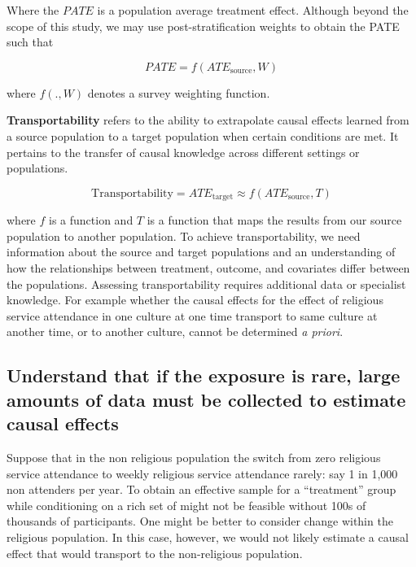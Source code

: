 \documentclass[
  singlecolumn]{report}
\begin{document}
Where the \(PATE\) is a population average treatment effect. Although
beyond the scope of this study, we may use post-stratification weights
to obtain the PATE such that

\[PATE =  f(ATE_{\text{source}}, W)\]

where \(f(.,W)\) denotes a survey weighting function.

\textbf{Transportability} refers to the ability to extrapolate causal
effects learned from a source population to a target population when
certain conditions are met. It pertains to the transfer of causal
knowledge across different settings or populations.

\[\text{Transportability} = ATE_{\text{target}} \approx f(ATE_{\text{source}}, T)\]

where \(f\) is a function and \(T\) is a function that maps the results
from our source population to another population. To achieve
transportability, we need information about the source and target
populations and an understanding of how the relationships between
treatment, outcome, and covariates differ between the populations.
Assessing transportability requires additional data or specialist
knowledge. For example whether the causal effects for the effect of
religious service attendance in one culture at one time transport to
same culture at another time, or to another culture, cannot be
determined \emph{a priori}.

\hypertarget{understand-that-if-the-exposure-is-rare-large-amounts-of-data-must-be-collected-to-estimate-causal-effects}{%
\subsection{\texorpdfstring{\textbf{Understand that if the exposure is
rare, large amounts of data must be collected to estimate causal
effects}}{Understand that if the exposure is rare, large amounts of data must be collected to estimate causal effects}}\label{understand-that-if-the-exposure-is-rare-large-amounts-of-data-must-be-collected-to-estimate-causal-effects}}

Suppose that in the non religious population the switch from zero
religious service attendance to weekly religious service attendance
rarely: say 1 in 1,000 non attenders per year. To obtain an effective
sample for a ``treatment'' group while conditioning on a rich set of
might not be feasible without 100s of thousands of participants. One
might be better to consider change within the religious population. In
this case, however, we would not likely estimate a causal effect that
would transport to the non-religious population.
\end{document}
